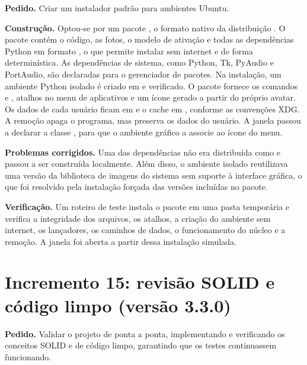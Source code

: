 \textbf{Pedido.} Criar um instalador padrão para ambientes Ubuntu.

\textbf{Construção.} Optou-se por um pacote , o formato nativo da distribuição
\cite{debian}. O pacote contém o código, as fotos, o modelo de ativação e todas as dependências Python
em formato , o que permite instalar sem internet e de forma determinística. As dependências de
sistema, como Python, Tk, PyAudio e PortAudio, são declaradas para o gerenciador de pacotes. Na
instalação, um ambiente Python isolado é criado em  e verificado. O pacote fornece
os comandos  e , atalhos no menu de aplicativos e um ícone
gerado a partir do próprio avatar. Os dados de cada usuário ficam em  e o
cache em , conforme as convenções XDG. A remoção apaga o programa, mas preserva
os dados do usuário. A janela passou a declarar a classe , para que o ambiente gráfico a
associe ao ícone do menu.

\textbf{Problemas corrigidos.} Uma das dependências não era distribuída como  e passou a ser
construída localmente. Além disso, o ambiente isolado reutilizava uma versão da biblioteca de imagens do
sistema sem suporte à interface gráfica, o que foi resolvido pela instalação forçada das versões
incluídas no pacote.

\textbf{Verificação.} Um roteiro de teste instala o pacote em uma pasta temporária e verifica a
integridade dos arquivos, os atalhos, a criação do ambiente sem internet, os lançadores, os caminhos de
dados, o funcionamento do núcleo e a remoção. A janela foi aberta a partir dessa instalação simulada.

\section{Incremento 15: revisão SOLID e código limpo (versão 3.3.0)}

\textbf{Pedido.} Validar o projeto de ponta a ponta, implementando e verificando os conceitos SOLID e de
código limpo, garantindo que os testes continuassem funcionando.

